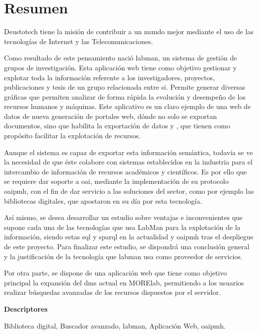 \chapter*{Resumen}

Deustotech tiene la misión de contribuir a un mundo mejor mediante el uso de las tecnologías de Internet y las Telecomunicaciones.

Como resultado de este pensamiento nació \acrshort{labman}, un sistema de gestión de grupos de investigación. Esta aplicación web tiene como objetivo gestionar y explotar toda la información referente a los investigadores, proyectos, publicaciones y tesis de un grupo relacionada entre si. Permite generar diversas gráficas que permiten analizar de forma rápida la evolución y desempeño de los recursos humanos y máquinas.
Este aplicativo es un claro ejemplo de una web de datos de nueva generación de portales web, dónde
no solo se exportan documentos, sino que habilita la exportación de datos y , que
tienen como propósito facilitar la explotación de recursos.

Aunque el sistema es capaz de exportar esta información semántica, todavía se ve la necesidad de que éste colabore con sistemas establecidos en la industria para el intercambio de información de recursos académicos y científicos.
Es por ello que se requiere dar soporte a \acrshort{oai}, mediante la implementación de su protocolo \acrshort{oaipmh}, con el fin de dar servicio a las soluciones del sector, como por ejemplo las bibliotecas digitales, que apostaron en su día por esta tecnología. 

Así mismo, se desea desarrollar un estudio sobre ventajas e inconvenientes que supone cada una de las tecnologías que usa LabMan para la explotación de la información, siendo estas \acrshort{sql} y \acrshort{sparql} en la actualidad y \acrshort{oaipmh} tras el despliegue de este proyecto. Para finalizar este estudio, se dispondrá una conclusión general y la justificación de la tecnología que \acrshort{labman} usa como proveedor de servicios.

Por otra parte, se dispone de una aplicación web que tiene como objetivo principal la expansión del \acrfull{dms} actual en MORElab, permitiendo a los usuarios realizar búsquedas avanzadas de los recursos dispuestos por el servidor.

\vspace{2em}

{\Large\bfseries\sffamily Descriptores}
\vspace{3\medskipamount}

Biblioteca digital, Buscador avanzado, \acrshort{labman}, Aplicación Web, \acrshort{oaipmh}.